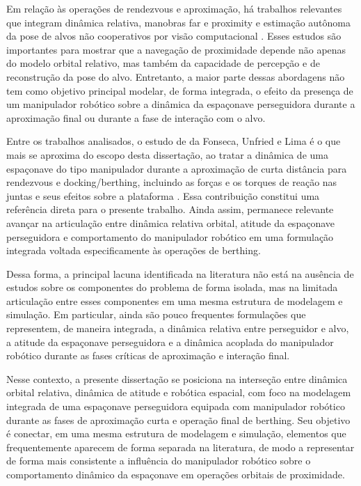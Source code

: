Em relação às operações de rendezvous e aproximação, há trabalhos relevantes que integram dinâmica relativa, manobras far e proximity e estimação autônoma da pose de alvos não cooperativos por visão computacional \cite{arantes2010far}. Esses estudos são importantes para mostrar que a navegação de proximidade depende não apenas do modelo orbital relativo, mas também da capacidade de percepção e de reconstrução da pose do alvo. Entretanto, a maior parte dessas abordagens não tem como objetivo principal modelar, de forma integrada, o efeito da presença de um manipulador robótico sobre a dinâmica da espaçonave perseguidora durante a aproximação final ou durante a fase de interação com o alvo.

Entre os trabalhos analisados, o estudo de da Fonseca, Unfried e Lima é o que mais se aproxima do escopo desta dissertação, ao tratar a dinâmica de uma espaçonave do tipo manipulador durante a aproximação de curta distância para rendezvous e docking/berthing, incluindo as forças e os torques de reação nas juntas e seus efeitos sobre a plataforma \cite{fonseca2016dynamics}. Essa contribuição constitui uma referência direta para o presente trabalho. Ainda assim, permanece relevante avançar na articulação entre dinâmica relativa orbital, atitude da espaçonave perseguidora e comportamento do manipulador robótico em uma formulação integrada voltada especificamente às operações de berthing.

Dessa forma, a principal lacuna identificada na literatura não está na ausência de estudos sobre os componentes do problema de forma isolada, mas na limitada articulação entre esses componentes em uma mesma estrutura de modelagem e simulação. Em particular, ainda são pouco frequentes formulações que representem, de maneira integrada, a dinâmica relativa entre perseguidor e alvo, a atitude da espaçonave perseguidora e a dinâmica acoplada do manipulador robótico durante as fases críticas de aproximação e interação final.

Nesse contexto, a presente dissertação se posiciona na interseção entre dinâmica orbital relativa, dinâmica de atitude e robótica espacial, com foco na modelagem integrada de uma espaçonave perseguidora equipada com manipulador robótico durante as fases de aproximação curta e operação final de berthing. Seu objetivo é conectar, em uma mesma estrutura de modelagem e simulação, elementos que frequentemente aparecem de forma separada na literatura, de modo a representar de forma mais consistente a influência do manipulador robótico sobre o comportamento dinâmico da espaçonave em operações orbitais de proximidade.

